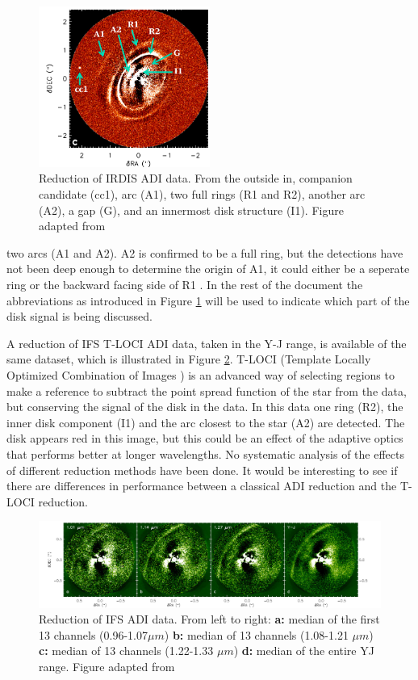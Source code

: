 \documentclass[twoside,single,12pt]{lion-msc}
\begin{document}
\begin{figure}
\includegraphics[width = 0.5\textwidth]{irdisjos}
\caption{Reduction of IRDIS ADI data. From the outside in, companion candidate (cc1), arc (A1), two full rings (R1 and R2), another arc (A2), a gap (G), and an innermost disk structure (I1). Figure adapted from \citep{DeBoer2016}}
\label{fig:irdisjos}
\vspace{-7mm}
\end{figure}

\noindent
two arcs (A1 and A2). A2 is confirmed to be a full ring, but the detections have not been deep enough to determine the origin of A1, it could either be a seperate ring or the backward facing side of R1 \citep{DeBoer2016}. In the rest of the document the abbreviations as introduced in Figure \ref{fig:irdisjos} will be used to indicate which part of the disk signal is being discussed.
\bigskip

A reduction of IFS T-LOCI ADI data, taken in the Y-J range, is available of the same dataset, which is illustrated in Figure \ref{fig:ifsjos}. T-LOCI (Template Locally Optimized Combination of Images \citep{Marois2010}) is an advanced way of selecting regions to make a reference to subtract the point spread function of the star from the data, but conserving the signal of the disk in the data. In this data one ring (R2), the inner disk component (I1) and the arc closest to the star (A2) are detected. The disk appears red in this image, but this could be an effect of the adaptive optics that performs better at longer wavelengths. No systematic analysis of the effects of different reduction methods have been done. It would be interesting to see if there are differences in performance between a classical ADI reduction and the T-LOCI reduction.

\begin{figure}[ht]
\includegraphics[width = \textwidth]{ifsjos}
\caption{Reduction of IFS ADI data. From left to right: \textbf{a:} median of the first 13 channels (0.96-1.07$\mu m$) \textbf{b:} median of 13 channels (1.08-1.21 $\mu m$) \textbf{c:} median of 13 channels (1.22-1.33 $\mu m$) \textbf{d:} median of the entire YJ range. Figure adapted from \citep{DeBoer2016}}
\label{fig:ifsjos}
\end{figure}
\end{document}
